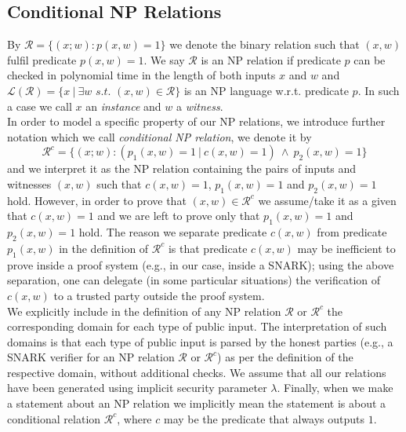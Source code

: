 \subsection{Conditional NP Relations}
\label{sec:conditional_relations}
\noindent By $\mathcal{R} =\{(x;w): p(x,w) = 1 \}$ we denote the binary relation such that $(x,w)$ 
fulfil predicate $p(x,w) = 1$. We say $\mathcal{R}$ is an NP relation if predicate $p$ can be checked in polynomial 
time in the length of both inputs $x$ and $w$ and $\mathcal{L}(\mathcal{R})= \{x \ | \ \exists w \textit{ s.t. } (x,w) \in \mathcal{R} \}$ 
is an NP language w.r.t. predicate $p$. In such a case we call $x$ an \emph{instance} and $w$ a \emph{witness}.  \\

\noindent  In order to model a specific property of our NP relations, we introduce further notation which we call \emph{conditional NP relation}, we denote it by 
$$\mathcal{R}^c = \{(x;w) : (p_1(x,w) =1 \ | \ c(x,w) =1) \ \wedge \ p_2(x,w) = 1 \}$$ and we interpret it as the NP relation containing the pairs of inputs and witnesses 
$(x,w)$ such that $c(x,w) =1$, $p_1(x,w) = 1$ and $p_2(x,w) =1$ hold. However, in order to prove that $(x,w) \in \mathcal{R}^c$ we assume/take it as a given that 
$c(x,w) =1$ and we are left to prove only that $p_1(x,w) = 1$ and $p_2(x,w) =1$ hold. The reason we separate predicate $c(x,w)$ from predicate $p_1(x,w)$ in the definition 
of $\mathcal{R}^c$ is that predicate $c(x,w)$ may be inefficient to prove inside a proof system (e.g., in our case, inside a SNARK); using the above separation, one can delegate 
(in some particular situations) the verification of $c(x,w)$ to a trusted party outside the proof system.\\

\noindent We explicitly include in the definition of any NP relation $\mathcal{R}$ or $\mathcal{R}^c$ the corresponding domain for each type 
of public input. The interpretation of such domains is that each type of public input is parsed by the honest parties (e.g., a SNARK verifier for an NP relation 
$\mathcal{R}$ or $\mathcal{R}^c$) as per the definition of the respective domain, without additional checks. We assume that all our relations have been 
generated using implicit security parameter $\lambda$. Finally, when we make a statement about an NP relation we implicitly 
mean the statement is about a conditional relation $\mathcal{R}^c$, where $c$ may be the predicate that always outputs $1$. 

